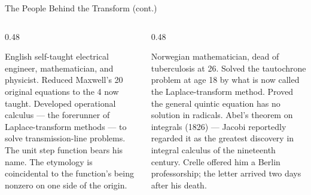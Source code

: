 \documentclass[aspectratio=169,11pt]{beamer}
\begin{document}
\begin{frame}{The People Behind the Transform (cont.)}
\footnotesize
\begin{columns}[T]
\begin{column}{0.48\textwidth}
\begin{topicsbox}
English self-taught electrical engineer, mathematician, and physicist. Reduced Maxwell's 20 original equations to the 4 now taught. Developed operational calculus --- the forerunner of Laplace-transform methods --- to solve transmission-line problems. The unit step function bears his name. The etymology is coincidental to the function's being nonzero on one side of the origin.
\end{topicsbox}
\end{column}
\begin{column}{0.48\textwidth}
\begin{topicsbox}
Norwegian mathematician, dead of tuberculosis at 26. Solved the tautochrone problem at age 18 by what is now called the Laplace-transform method. Proved the general quintic equation has no solution in radicals. Abel's theorem on integrals (1826) --- Jacobi reportedly regarded it as the greatest discovery in integral calculus of the nineteenth century. Crelle offered him a Berlin professorship; the letter arrived two days after his death.
\end{topicsbox}
\end{column}
\end{columns}
\end{frame}
\end{document}
